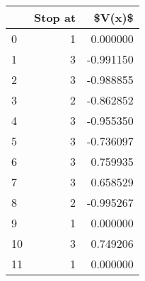 \begin{tabular}{lrr}
\toprule
{} &  Stop at &    \$V(x)\$ \\
\midrule
0  &        1 &  0.000000 \\
1  &        3 & -0.991150 \\
2  &        3 & -0.988855 \\
3  &        2 & -0.862852 \\
4  &        3 & -0.955350 \\
5  &        3 & -0.736097 \\
6  &        3 &  0.759935 \\
7  &        3 &  0.658529 \\
8  &        2 & -0.995267 \\
9  &        1 &  0.000000 \\
10 &        3 &  0.749206 \\
11 &        1 &  0.000000 \\
\bottomrule
\end{tabular}
